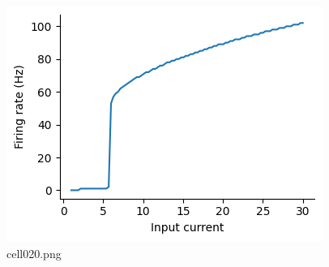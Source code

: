 \begin{figure}[ht]
	\centering
	\includegraphics[scale=0.8, max width=\linewidth]{./fig/neuron-model/hodgkin-huxley/cell020.png}
	\caption{cell020.png}
	\label{cell020.png}
\end{figure}
